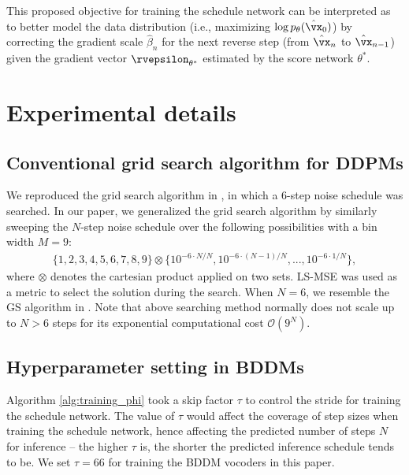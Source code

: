 This proposed objective for training the schedule network can be interpreted as to better model the data distribution (i.e., maximizing $\log p_\theta(\hat{\vx}_0)$) by correcting the gradient scale $\hat{\beta}_n$ for the next reverse step (from $\hat{\vx}_n$ to $\hat{\vx}_{n-1}$) given the gradient vector $\rvepsilon_{\theta^*}$ estimated by the score network $\theta^*$.

























\section{Experimental details}
\label{appendix:B}
\subsection{Conventional grid search algorithm for DDPMs}
\label{sec:gridsearch}
We reproduced the grid search algorithm in \citep{nanxin2020}, in which a 6-step noise schedule was searched. In our paper, we generalized the grid search algorithm by similarly sweeping the $N$-step noise schedule over the following possibilities with a bin width $M=9$:
\begin{align}
    \{1, 2, 3, 4, 5, 6, 7, 8, 9\} \otimes \{10^{-6\cdot N/N}, 10^{-6\cdot (N-1)/N}, ..., 10^{-6\cdot 1/N}\},
\end{align}
where $\otimes$ denotes the cartesian product applied on two sets. LS-MSE was used as a metric to select the solution during the search. When $N=6$, we resemble the GS algorithm in \citep{nanxin2020}. Note that above searching method normally does not scale up to $N>6$ steps for its exponential computational cost $\mathcal{O}(9^{N})$.

\subsection{Hyperparameter setting in BDDMs}
Algorithm \ref{alg:training_phi} took a skip factor $\tau$ to control the stride for training the schedule network. The value of $\tau$ would affect the coverage of step sizes when training the schedule network, hence affecting the predicted number of steps $N$ for inference -- the higher $\tau$ is, the shorter the predicted inference schedule tends to be. We set $\tau=66$ for training the BDDM vocoders in this paper.

